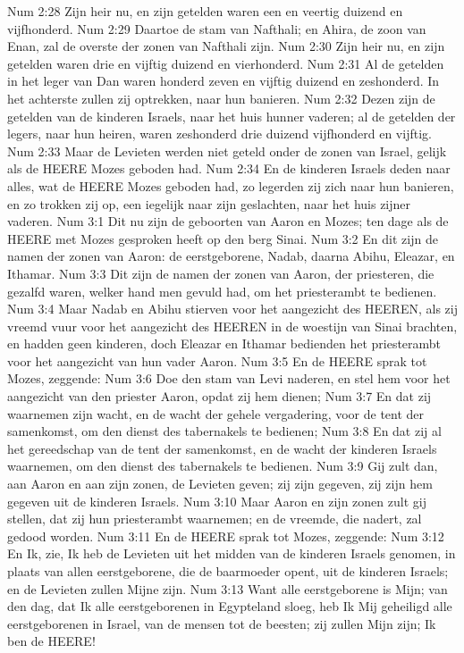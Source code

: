Num 2:28  Zijn heir nu, en zijn getelden waren een en veertig duizend en vijfhonderd.
Num 2:29  Daartoe de stam van Nafthali; en Ahira, de zoon van Enan, zal de overste der zonen van Nafthali zijn.
Num 2:30  Zijn heir nu, en zijn getelden waren drie en vijftig duizend en vierhonderd.
Num 2:31  Al de getelden in het leger van Dan waren honderd zeven en vijftig duizend en zeshonderd. In het achterste zullen zij optrekken, naar hun banieren.
Num 2:32  Dezen zijn de getelden van de kinderen Israels, naar het huis hunner vaderen; al de getelden der legers, naar hun heiren, waren zeshonderd drie duizend vijfhonderd en vijftig.
Num 2:33  Maar de Levieten werden niet geteld onder de zonen van Israel, gelijk als de HEERE Mozes geboden had.
Num 2:34  En de kinderen Israels deden naar alles, wat de HEERE Mozes geboden had, zo legerden zij zich naar hun banieren, en zo trokken zij op, een iegelijk naar zijn geslachten, naar het huis zijner vaderen.
Num 3:1  Dit nu zijn de geboorten van Aaron en Mozes; ten dage als de HEERE met Mozes gesproken heeft op den berg Sinai.
Num 3:2  En dit zijn de namen der zonen van Aaron: de eerstgeborene, Nadab, daarna Abihu, Eleazar, en Ithamar.
Num 3:3  Dit zijn de namen der zonen van Aaron, der priesteren, die gezalfd waren, welker hand men gevuld had, om het priesterambt te bedienen.
Num 3:4  Maar Nadab en Abihu stierven voor het aangezicht des HEEREN, als zij vreemd vuur voor het aangezicht des HEEREN in de woestijn van Sinai brachten, en hadden geen kinderen, doch Eleazar en Ithamar bedienden het priesterambt voor het aangezicht van hun vader Aaron.
Num 3:5  En de HEERE sprak tot Mozes, zeggende:
Num 3:6  Doe den stam van Levi naderen, en stel hem voor het aangezicht van den priester Aaron, opdat zij hem dienen;
Num 3:7  En dat zij waarnemen zijn wacht, en de wacht der gehele vergadering, voor de tent der samenkomst, om den dienst des tabernakels te bedienen;
Num 3:8  En dat zij al het gereedschap van de tent der samenkomst, en de wacht der kinderen Israels waarnemen, om den dienst des tabernakels te bedienen.
Num 3:9  Gij zult dan, aan Aaron en aan zijn zonen, de Levieten geven; zij zijn gegeven, zij zijn hem gegeven uit de kinderen Israels.
Num 3:10  Maar Aaron en zijn zonen zult gij stellen, dat zij hun priesterambt waarnemen; en de vreemde, die nadert, zal gedood worden.
Num 3:11  En de HEERE sprak tot Mozes, zeggende:
Num 3:12  En Ik, zie, Ik heb de Levieten uit het midden van de kinderen Israels genomen, in plaats van allen eerstgeborene, die de baarmoeder opent, uit de kinderen Israels; en de Levieten zullen Mijne zijn.
Num 3:13  Want alle eerstgeborene is Mijn; van den dag, dat Ik alle eerstgeborenen in Egypteland sloeg, heb Ik Mij geheiligd alle eerstgeborenen in Israel, van de mensen tot de beesten; zij zullen Mijn zijn; Ik ben de HEERE!
